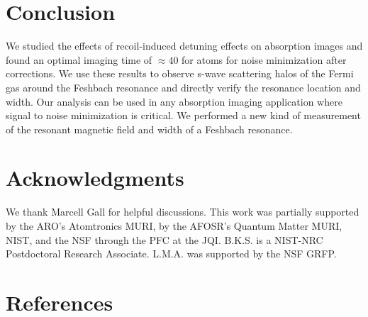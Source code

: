 \documentclass[12pt]{iopart}
\begin{document}
\section{Conclusion}
We studied the effects of recoil-induced detuning effects on absorption images and found an optimal imaging time of $\approx40$ \us{} for \K{} atoms for noise minimization after corrections. We use these results to observe s-wave scattering halos of the Fermi gas around the Feshbach resonance and directly verify the resonance location and width. Our analysis can be used in any absorption imaging application where signal to noise minimization is critical. We performed a new kind of measurement of the resonant magnetic field and width of a Feshbach resonance. 
\section*{Acknowledgments}
We thank Marcell Gall for helpful discussions. This work was partially supported by the ARO’s Atomtronics MURI, by the
AFOSR’s Quantum Matter MURI, NIST, and the NSF through the PFC at the JQI. B.K.S. is
a NIST-NRC Postdoctoral Research Associate. L.M.A. was supported by the NSF GRFP.

\section*{References}
{}

\end{document}
